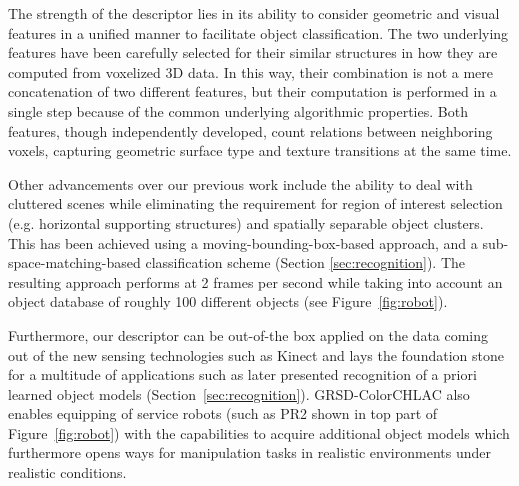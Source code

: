 \documentclass[conference]{sty/IEEEtran}
\begin{document}
The strength of the descriptor lies in its ability to consider geometric and
visual features in a unified manner to facilitate object classification. The two
underlying features have been carefully selected for their similar structures in
how they are computed from voxelized 3D data. In this way, their combination is
not a mere concatenation of two different features, but their computation is
performed in a single step because of the common underlying algorithmic
properties. Both features, though independently developed, count relations
between neighboring voxels, capturing geometric surface type and texture
transitions at the same time.

Other advancements over our previous work include the ability to deal with
cluttered scenes while eliminating the requirement for region of interest
selection (e.g. horizontal supporting structures) and spatially separable object
clusters. This has been achieved using a moving-bounding-box-based approach, and
a sub-space-matching-based classification scheme (Section
\ref{sec:recognition}). The resulting approach performs at 2 frames per second
while taking into account an object database of roughly 100 different objects
(see Figure~\ref{fig:robot}).



Furthermore, our descriptor can be out-of-the box applied on the data coming out of the 
new sensing technologies such as Kinect and lays the foundation stone for a
multitude of applications such as later presented recognition of a priori learned object models
(Section~\ref{sec:recognition}). GRSD-ColorCHLAC also enables equipping of service robots 
(such as PR2 shown in top part of Figure~\ref{fig:robot}) with the 
capabilities to acquire additional object models which furthermore opens ways 
for manipulation tasks in realistic environments under realistic conditions.
\end{document}
